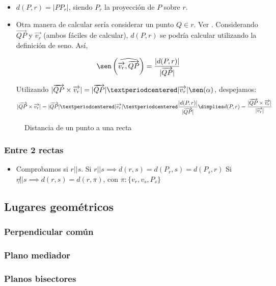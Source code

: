 \begin{itemize}
  \item $d(P,r) = |PP_{r}|$, siendo $P_r$ la proyección de $P$ sobre $r$.
  \item Otra manera de calcular sería considerar un punto $Q\in r$. Ver .
  \subitem Considerando $\vec{QP}$ y $\vec{v_r}$ (ambos fáciles de calcular), $d(P,r)$ se podría calcular utilizando la definición de seno. Así,
  
  \[\sen\left(\widehat{\vec{v_r},\vec{QP}}\right) = \displaystyle\frac{|d(P,r)|}{|\vec{QP}|}\]

  \subitem Utilizando $|\vec{QP}\times\vec{v_r}| = |\vec{QP}|·|\vec{v_r}|\sen(\alpha)$, despejamos:
  \[
    |\vec{QP}\times\vec{v_r}| = |\vec{QP}|·|\vec{v_r}|·\frac{|d(P,r)|}{|\vec{QP}|} \dimplies d(P,r) = \frac{|\vec{QP}\times\vec{v_r}|}{|\vec{v_r}|}
  \]
\end{itemize}

\begin{figure}[hbtp]
\centering
{}

\label{fig::dist-punto-recta}
\caption{Distancia de un punto a una recta}
\end{figure}



\subsubsection{Entre 2 rectas}
\begin{itemize}
  \item Comprobamos si $r||s$. 
  \subitem Si $r||s \implies d(r,s) = d(P_r,s) = d(P_s,r)$
  \subitem Si $r\not|| s \implies d(r,s) = d(r,\pi)$, con $\pi:\{v_r,v_s,P_s\}$
\end{itemize}


\subsection{Lugares geométricos}
\subsubsection{Perpendicular común}
\subsubsection{Plano mediador}
\subsubsection{Planos bisectores}

